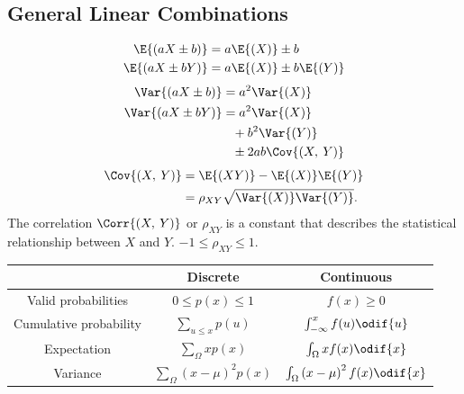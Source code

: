 \documentclass{article}
\begin{document}
\begin{minipage}{126.1962963mm}
\begin{multicols}{2}
        \subsection*{General Linear Combinations}
        \begin{align*}
            \E{\left( aX\pm b \right)}  & = a\E{\left( X \right)} \pm b                     \\
            \E{\left( aX\pm bY \right)} & = a\E{\left( X \right)} \pm b\E{\left( Y \right)}
        \end{align*}
        \begin{align*}
            \Var{\left( aX\pm b \right)}  & = a^2\Var{\left( X \right)}                    \\
            \Var{\left( aX\pm bY \right)} & = a^2\Var{\left( X \right)}                    \\
                                          & \phantom{=} + b^2\Var{\left( Y \right)}        \\
                                          & \phantom{=} \pm 2ab\Cov{\left( X,\: Y \right)}
        \end{align*}
        \begin{align*}
            \Cov{\left( X,\: Y \right)} & = \E{\left( XY \right)} - \E{\left( X \right)}\E{\left( Y \right)} \\
                                        & = \rho_{XY} \sqrt{\Var{\left( X \right)}\Var{\left( Y \right)}}.
        \end{align*}
        The correlation \(\Corr{\left( X,\: Y \right)}\) or \(\rho_{XY}\) is a constant that describes the statistical relationship
        between \(X\) and \(Y\). \(-1 \leq \rho_{XY} \leq 1\).
    \end{multicols}
    \begin{table}[H]
        \centering
        \begin{tabular}{c c c}
            \toprule
                                   & \textbf{Discrete}                            & \textbf{Continuous}                                \\
            \midrule
            Valid probabilities    & \(0 \leq p(x) \leq 1\)                         & \(f(x) \geq 0\)                                      \\
            Cumulative probability & \(\sum_{u \leq x} p(u)\)                       & \(\int_{-\infty}^{x} f(u) \odif{u}\)                   \\
            Expectation            & \(\sum_{\Omega} xp(x)\)                        & \(\int_{\Omega} xf(x)\odif{x}\)                        \\
            Variance               & \(\sum_{\Omega} \left( x - \mu \right)^2p(x)\) & \(\int_{\Omega} \left( x - \mu \right)^2f(x)\odif{x}\) \\
            \bottomrule
        \end{tabular}
    \end{table}
\end{minipage}\hfill%
\end{document}
